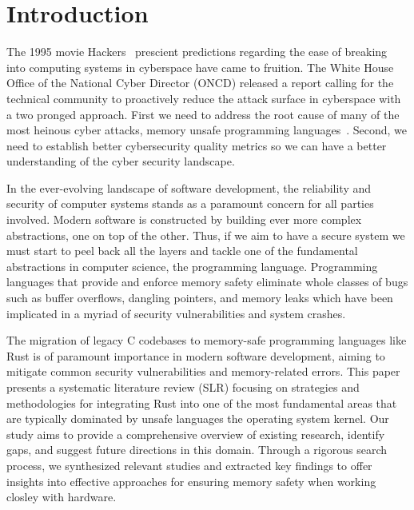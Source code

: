 \documentclass[sigconf]{acmart}
\begin{document}


\maketitle

\section{Introduction}

The 1995 movie Hackers~\cite{Wikipedia_contributors2024-zr} prescient predictions regarding the ease
of breaking into computing systems in cyberspace have came to fruition. The White House Office of
the National Cyber Director (ONCD) released a report calling for the technical community to
proactively reduce the attack surface in cyberspace with a two pronged approach. First we need to
address the root cause of many of the most heinous cyber attacks, memory unsafe programming
languages~\cite{United_States_Gov2024-pp}. Second, we need to establish better cybersecurity quality
metrics so we can have a better understanding of the cyber security landscape.

In the ever-evolving landscape of software development, the reliability and security of computer
systems stands as a paramount concern for all parties involved. Modern software is constructed by
building ever more complex abstractions, one on top of the other. Thus, if we aim to have a secure
system we must start to peel back all the layers and tackle one of the fundamental abstractions in
computer science, the programming language. Programming languages that provide and enforce memory
safety eliminate whole classes of bugs such as buffer overflows, dangling pointers, and memory leaks
which have been implicated in a myriad of security vulnerabilities and system crashes.

The migration of legacy C codebases to memory-safe programming languages like Rust is of paramount
importance in modern software development, aiming to mitigate common security vulnerabilities and
memory-related errors. This paper presents a systematic literature review (SLR) focusing on
strategies and methodologies for integrating Rust into one of the most fundamental areas that are
typically dominated by unsafe languages the operating system kernel. Our study aims to provide a
comprehensive overview of existing research, identify gaps, and suggest future directions in this
domain. Through a rigorous search process, we synthesized relevant studies and extracted key
findings to offer insights into effective approaches for ensuring memory safety when working closley
with hardware.
\end{document}
